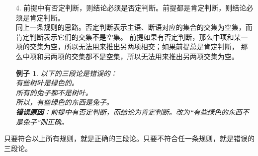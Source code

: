 \documentclass[12pt,UTF8]{ctexbook}
\newtheorem*{ex*}{例子}
\begin{document}
\begin{enumerate}
    \item[4.] 前提中有否定判断，则结论必须是否定判断。前提都是肯定判断，则结论必须是肯定判断。\\
    同上一条规则的思路。否定判断表示主语、断语对应的集合的交集为空集，而肯定判断表示它们的交集不是空集。
    前提如果有否定判断，那么中项和某一项的交集为空，所以无法用来推出另两项相交；如果前提总是肯定判断，
    那么中项和另两项的交集都不是空集，所以无法用来推出另两项交集为空。
    \begin{ex*}
        以下的三段论是错误的： \\
        \indent 有些树叶是绿色的。\\
        \indent 所有的兔子都不是树叶。\\
        \indent 所以，有些绿色的东西是兔子。\\
        \textbf{错误原因}：前提中有否定判断，而结论为肯定判断。改为“有些绿色的东西不是兔子”则正确。
    \end{ex*}
\end{enumerate}
只要符合以上所有规则，就是正确的三段论。只要不符合任一条规则，就是错误的三段论。
\end{document}
